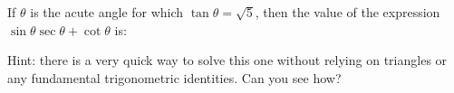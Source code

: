 \documentclass{ximera}
\author{Ivo Terek}
\begin{document}
\begin{exercise}

  If $\theta$ is the acute angle for which $\tan\theta=\sqrt{5}$, then the value of the expression $\sin\theta\sec\theta+\cot\theta$ is:

  \begin{multipleChoice}
  \end{multipleChoice}

  Hint: there is a very quick way to solve this one without relying on triangles or any fundamental trigonometric identities. Can you see how?
\end{exercise}
\end{document}
